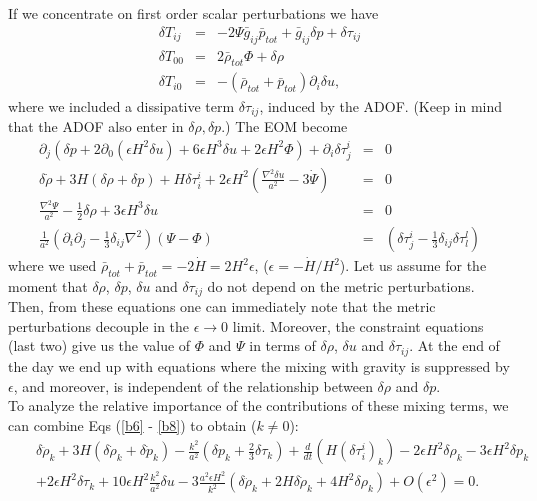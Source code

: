 \documentclass[11pt,amsmath,floats,floatfix,nofootinbib,secnumarabic, superscriptaddress, tightenlines]{revtex4}
\newcommand{\bea}{\begin{eqnarray}}
\newcommand{\eea}{\end{eqnarray}}
\newcommand{\nn}{\nonumber}
\begin{document}
{If we concentrate on first order scalar perturbations we have
\bea \label{stresslin}
\delta T_{ij} &=& -2\Psi \bar g_{ij} \bar p_{tot}  + \bar g_{ij} \delta p + \delta \tau_{ij}\\
\delta T_{00} &=& 2 \bar \rho_{tot} \Phi + \delta \rho \\
\delta T_{i0} &=&   - (\bar\rho_{tot}+\bar p_{tot}) \partial_i \delta u,
\eea
where we included a dissipative term $ \delta \tau_{ij}$, induced by the ADOF. (Keep in mind that the ADOF also enter in $\delta\rho, \delta p$.)
The EOM become \cite{weinberg}
\bea
\label{b6}
\partial_j\left(\delta p +2 \partial_0(\epsilon H^2\delta u) + 6\epsilon H^3\delta u + 2\epsilon H^2\Phi\right) +   \partial_i\delta\tau^i_j &=& 0\\
\delta\dot\rho + 3 H(\delta\rho+\delta p) + H\delta \tau^i_i + 2\epsilon H^2 \left(\frac{\nabla^2\delta u}{a^2} -3 \dot \Psi\right) &=& 0\label{b7}\\
\frac{\nabla^2\Psi}{a^2}-\frac{1}{2}\delta \rho + 3 \epsilon H^3 \delta u &=& 0\label{b8}\\
\frac{1}{a^2} \left( \partial_i\partial_j - \frac{1}{3} \delta_{ij} \nabla^2\right) (\Psi-\Phi)&=& \left(\delta\tau^i_j-\frac{1}{3}\delta_{ij} \delta\tau^l_l\right) \label{b9}
\eea
where we used $\bar \rho_{tot}+\bar p_{tot} = -2\dot H= 2H^2\epsilon$, ($\epsilon = -\dot H/H^2$). Let us assume for the moment that  $\delta \rho$, $\delta p$, $\delta u$ and  $\delta \tau_{ij}$
do not depend on the metric perturbations. Then, from these equations one can immediately note that the metric perturbations decouple
 in the $\epsilon \to 0$ limit. Moreover, the constraint equations (last two) give us the value of $\Phi$ and $\Psi$ in terms of $\delta \rho$, $\delta u$
and $\delta \tau_{ij}$. At the end of the day we end up with equations where the mixing with gravity is suppressed by $\epsilon$,
and moreover, is independent of the relationship between $\delta \rho$ and $\delta p$.\\

To analyze the relative importance of the contributions of these mixing terms, we can combine Eqs (\ref{b6} - \ref{b8}) to obtain ($k\neq 0$):
\bea
&&\delta\ddot \rho_k +3 H (\delta\dot\rho_k +\delta \dot p_k)-\frac{k^2}{a^2}\left(\delta p_k+ \frac{2}{3}\delta\tau_k\right)+ \frac{d}{dt}\left(H(\delta \tau^i_i)_k\right)-2\epsilon H^2 \delta\rho_k-3\epsilon H^2\delta p_k   \nn \\ && +2\epsilon H^2\delta\tau_k+10\epsilon H^2\frac{k^2}{a^2}\delta u-3\frac{a^2\epsilon H^2}{k^2}\left(\delta\ddot\rho_k + 2H \delta\dot\rho_k +4H^2\delta\rho_k\right)
+O(\epsilon^2)=0.
\eea

}
\end{document}
